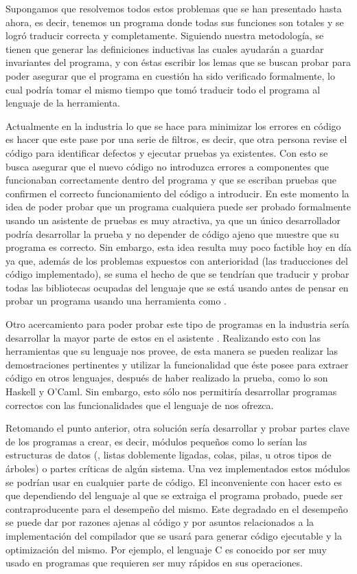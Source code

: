 Supongamos que resolvemos todos estos problemas que se han presentado hasta ahora, es decir,
tenemos un programa donde todas sus funciones son totales y se logr\'o traducir correcta y
completamente. 
Siguiendo nuestra metodología, se tienen que generar las definiciones inductivas las cuales ayudar\'an a
guardar invariantes del programa, y con \'estas escribir los lemas que se buscan probar para poder
asegurar que el programa en cuesti\'on ha sido verificado formalmente, lo cual 
podría tomar el mismo tiempo que tom\'o traducir todo el programa al lenguaje de la herramienta.

Actualmente en la industria lo que se hace para minimizar los errores en c\'odigo es hacer que este
pase por una serie de filtros, es decir, que otra persona revise el c\'odigo para identificar defectos y ejecutar pruebas ya existentes. 
Con esto se busca asegurar que el nuevo c\'odigo no introduzca errores a componentes que funcionaban 
correctamente dentro del programa y que se escriban pruebas que confirmen el correcto funcionamiento del c\'odigo a introducir. 
En este momento la idea de poder probar que un programa cualquiera puede ser probado formalmente usando un asistente de 
pruebas es muy atractiva, ya que un \'unico desarrollador podr\'ia desarrollar la prueba y no 
depender de código ajeno que muestre que su programa es correcto. Sin embargo, esta idea resulta muy 
poco factible hoy en día ya que, además de los problemas expuestos con anterioridad (las 
traducciones del c\'odigo implementado), se suma el hecho de que se tendrían que traducir y probar 
todas las bibliotecas ocupadas del lenguaje que se est\'a usando antes de pensar en probar un 
programa usando una herramienta como {\coq}.

Otro acercamiento para poder probar este tipo de programas en la industria ser\'ia desarrollar la 
mayor parte de estos en el asistente {\coq}. Realizando esto con las herramientas que su lenguaje 
nos provee, de esta manera se pueden realizar las demostraciones pertinentes y utilizar la 
funcionalidad que \'este posee para extraer c\'odigo en otros lenguajes, después de haber realizado la 
prueba, como lo son Haskell y O'Caml. Sin embargo, esto s\'olo nos permitiría desarrollar programas 
correctos con las funcionalidades que el lenguaje de {\coq} nos ofrezca.

Retomando el punto anterior, otra soluci\'on ser\'ia desarrollar y probar partes clave de los 
programas a crear, es decir, m\'odulos pequeños como lo ser\'ian las estructuras de datos 
({\arns}, listas doblemente ligadas, colas, pilas, u otros tipos de \'arboles) o partes críticas de algún sistema. 
Una vez implementados estos m\'odulos se podrían usar en cualquier parte de c\'odigo. El inconveniente con 
hacer esto es que dependiendo del lenguaje al que se extraiga el programa probado, puede ser 
contraproducente para el desempeño del mismo. Este degradado en el desempeño se puede dar por 
razones ajenas al c\'odigo y por asuntos relacionados a la implementaci\'on del compilador que 
se usar\'a para generar c\'odigo ejecutable y la optimizaci\'on del mismo. Por ejemplo, el 
lenguaje C es conocido por ser muy usado en programas que requieren ser muy rápidos en sus 
operaciones.

